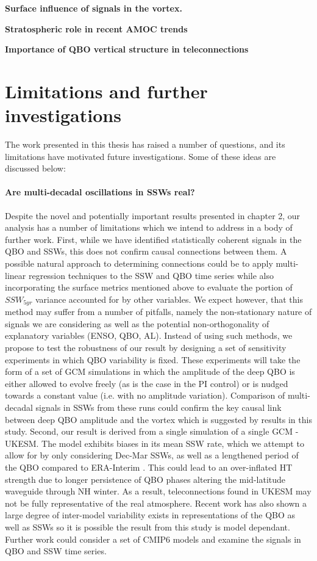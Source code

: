 \textbf{Surface influence of signals in the vortex.}

\textbf{Stratospheric role in recent AMOC trends}

\textbf{Importance of QBO vertical structure in teleconnections}

\section{Limitations and further investigations}

The work presented in this thesis has raised a number of questions, and its
limitations have motivated future investigations. Some of these ideas are
discussed below:

\paragraph{Are multi-decadal oscillations in SSWs real?} 

Despite the novel and potentially important results presented in chapter 2, our analysis has a number of limitations which we intend to address in a body of further work. First, while we have identified statistically coherent signals in the QBO and SSWs, this does not confirm causal connections between them. A possible natural approach to determining connections could be to apply multi-linear regression techniques to the SSW and QBO time series while also incorporating the surface metrics mentioned above to evaluate the portion of $SSW_{5yr}$ variance accounted for by other variables. We expect however, that this method may suffer from a number of pitfalls, namely the non-stationary nature of signals we are considering as well as the potential non-orthogonality of explanatory variables (ENSO, QBO, AL). Instead of using such methods, we propose to test the robustness of our result by designing a set of sensitivity experiments in which QBO variability is fixed. These experiments will take the form of a set of GCM simulations in which the amplitude of the deep QBO is either allowed to evolve freely (as is the case in the PI control) or is nudged towards a constant value (i.e. with no amplitude variation). Comparison of multi-decadal signals in SSWs from these runs could confirm the key causal link between deep QBO amplitude and the vortex which is suggested by results in this study. Second, our result is derived from a single simulation of a single GCM - UKESM. The model exhibits biases in its mean SSW rate, which we attempt to allow for by only considering Dec-Mar SSWs, as well as a lengthened period of the QBO compared to ERA-Interim \citep{bushellEvaluation2020}. This could lead to an over-inflated HT strength due to longer persistence of QBO phases altering the mid-latitude waveguide through NH winter. As a result, teleconnections found in UKESM may not be fully representative of the real atmosphere. Recent work has also shown a large degree of inter-model variability exists in representations of the QBO as well as SSWs \citep{bushellEvaluation2020,ayarzaguenaUncertainty2020} so it is possible the result from this study is model dependant. Further work could consider a set of CMIP6 models and examine the signals in QBO and SSW time series. 

